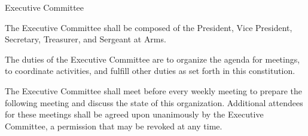 {
\begin{article}{Executive Committee}
	\item The Executive Committee shall be composed of the President, Vice President, Secretary, Treasurer, and Sergeant at Arms.
	\item The duties of the Executive Committee are to organize the agenda for meetings, to coordinate activities, and fulfill other duties as set forth in this constitution.
	\item The Executive Committee shall meet before every weekly meeting to prepare the following meeting and discuss the state of this organization.  Additional attendees for these meetings shall be agreed upon unanimously by the Executive Committee, a permission that may be revoked at any time.
\end{article}
}